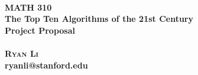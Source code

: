 \begin{titlepage}




\center %

\HRule \\[0.4cm]
 \bf \Huge MATH 310\\ %
\Huge The Top Ten Algorithms of the 21st Century\\[0.3cm] %
\Large Project Proposal %
\\[0.3cm] %
\HRule \\[1.5cm]





\Large \textsc{Ryan} \textsc{Li}\\ %
\large ryanli@stanford.edu\\[2.5cm]



\end{titlepage}
